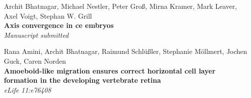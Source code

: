 Archit Bhatnagar, Michael Nestler, Peter Groß, Mirna Kramer, Mark Leaver, Axel Voigt, Stephan W. Grill\\
\textbf{Axis convergence in \acs{ce} embryos}\\
\textit{Manuscript submitted}

Rana Amini, Archit Bhatnagar, Raimund Schl{\"u}ßler, Stephanie M{\"o}llmert, Jochen Guck, Caren Norden\\
\textbf{Amoeboid-like migration ensures correct horizontal cell layer formation in the developing vertebrate retina}\\
\textit{eLife 11:e76408}